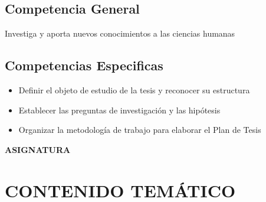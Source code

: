 \documentclass[a4paper]{article}
\begin{document}
\subsection{Competencia General}
Investiga y aporta nuevos conocimientos a las ciencias humanas
\subsection{Competencias Especificas}
\begin{itemize}
\item Definir el objeto de estudio de la tesis y reconocer su estructura
\item Establecer las preguntas de investigación y las hipótesis
\item Organizar la metodología de trabajo para elaborar el Plan de Tesis
\end{itemize}
\newpage
\begin{flushleft}
{\huge \bf ASIGNATURA}\\[0.3cm]
\end{flushleft}
\section{CONTENIDO TEMÁTICO}
\end{document}

